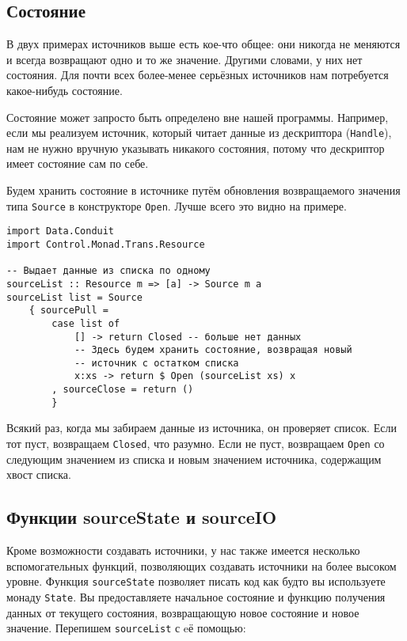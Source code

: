 \subsection{Состояние}
В двух примерах источников выше есть кое-что общее: они никогда не меняются и всегда возвращают одно и то же
значение. Другими словами, у них нет состояния. Для почти всех более-менее серьёзных источников нам
потребуется какое-нибудь состояние.

\begin{remark}
Состояние может запросто быть определено вне нашей программы. Например, если мы
реализуем источник, который читает данные из дескриптора (\lstinline{Handle}), нам не нужно вручную
указывать никакого состояния, потому что дескриптор имеет состояние сам по себе.
\end{remark}

Будем хранить состояние в источнике путём обновления возвращаемого значения типа
\lstinline=Source= в конструкторе \lstinline=Open=. Лучше всего это видно на
примере.

\begin{lstlisting}
import Data.Conduit
import Control.Monad.Trans.Resource

-- Выдает данные из списка по одному
sourceList :: Resource m => [a] -> Source m a
sourceList list = Source
    { sourcePull =
        case list of
            [] -> return Closed -- больше нет данных
            -- Здесь будем хранить состояние, возвращая новый
            -- источник с остатком списка
            x:xs -> return $ Open (sourceList xs) x
        , sourceClose = return ()
        }
\end{lstlisting}

Всякий раз, когда мы забираем данные из источника, он проверяет список. Если тот пуст,
возвращаем \lstinline=Closed=, что разумно. Если не пуст, возвращаем \lstinline=Open= со
следующим значением из
списка и новым значением источника, содержащим хвост списка.

\subsection{Функции sourceState и sourceIO}
Кроме возможности создавать источники, у нас также имеется несколько вспомогательных функций,
позволяющих создавать источники на более высоком уровне. Функция \lstinline=sourceState=
позволяет писать
код как будто вы используете монаду \lstinline=State=. Вы предоставляете начальное
состояние и
функцию получения данных от текущего состояния, возвращающую новое состояние и
новое значение. Перепишем \lstinline=sourceList= с eё помощью:

